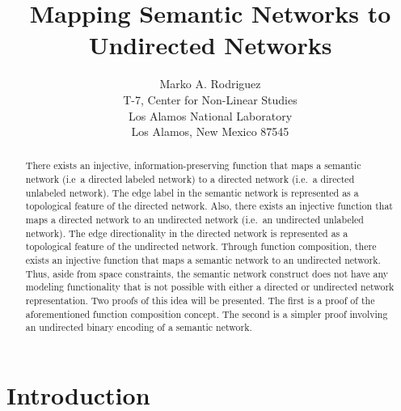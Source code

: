 \documentclass[twocolumn,preprintnumbers,amsmath,amssymb,letter]{revtex4}
\begin{document}

\title{Mapping Semantic Networks to Undirected Networks}

\author{Marko A. Rodriguez \\
		T-7, Center for Non-Linear Studies \\
		Los Alamos National Laboratory \\
		Los Alamos, New Mexico 87545}
		

 \begin{abstract}
There exists an injective, information-preserving function that maps a semantic network (i.e~a directed labeled network) to a directed network (i.e.~a directed unlabeled network). The edge label in the semantic network is represented as a topological feature of the directed network. Also, there exists an injective function that maps a directed network to an undirected network (i.e.~an undirected unlabeled network). The edge directionality in the directed network is represented as a topological feature of the undirected network. Through function composition, there exists an injective function that maps a semantic network to an undirected network. Thus, aside from space constraints, the semantic network construct does not have any modeling functionality that is not possible with either a directed or undirected network representation. Two proofs of this idea will be presented. The first is a proof of the aforementioned function composition concept. The second is a simpler proof involving an undirected binary encoding of a semantic network.
\end{abstract}

\maketitle{}

\section{Introduction}
\end{document}
